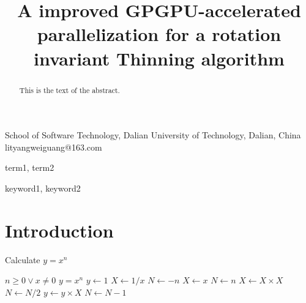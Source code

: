 \documentclass{sigplanconf}
\begin{document}
\setlength{\pdfpageheight}{\paperheight}
\setlength{\pdfpagewidth}{\paperwidth}






\title{A improved GPGPU-accelerated parallelization for a rotation invariant Thinning algorithm}

           {School of Software Technology, Dalian University of Technology, Dalian, China}
           {lityangweiguang@163.com}

\maketitle

\begin{abstract}
This is the text of the abstract.
\end{abstract}


\terms
term1, term2

\keywords
keyword1, keyword2

\section{Introduction}



\begin{algorithm}
  \caption{Calculate $y = x^n$}
  \label{alg1}
  \begin{algorithmic}
  \REQUIRE $n \geq 0 \vee x \neq 0$
  \ENSURE $y = x^n$
  \STATE $y \gets 1$
  \STATE $X \gets 1 / x$
  \STATE $N \gets -n$
  \ELSE
  \STATE $X \gets x$
  \STATE $N \gets n$
  \ENDIF
  \STATE $X \gets X \times X$
  \STATE $N \gets N / 2$
  \ELSE[$N$ is odd]
  \STATE $y \gets y \times X$
  \STATE $N \gets N - 1$
  \ENDIF
  \ENDWHILE
  \end{algorithmic}
\end{algorithm}
\end{document}
